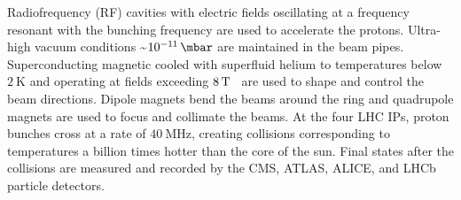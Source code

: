 Radiofrequency (RF) cavities with electric fields oscillating at a frequency resonant with the bunching frequency are used to accelerate the protons.
Ultra-high vacuum conditions \sim$\SI{e-11}{\mbar}$ are maintained in the beam pipes.
Superconducting magnetic cooled with superfluid helium to temperatures below $\SI{2}{\K}$ and operating at fields exceeding $\SI{8}{\T}$~\cite{LyndonEvans_2008} are used to shape and control the beam directions.
Dipole magnets bend the beams around the ring and quadrupole magnets are used to focus and collimate the beams.
At the four LHC IPs, proton bunches cross at a rate of $\SI{40}{\MHz}$, creating collisions corresponding to temperatures a billion times hotter than the core of the sun.
Final states after the collisions are measured and recorded by the CMS, ATLAS, ALICE, and LHCb particle detectors.


